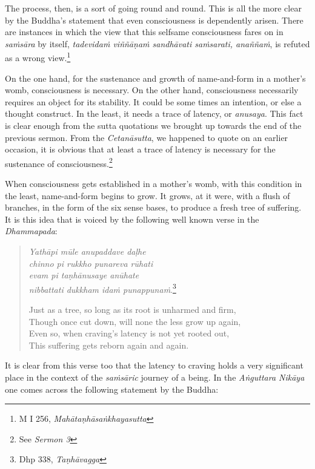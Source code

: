 The process, then, is a sort of going round and round. This is all the more clear by the Buddha's statement that even consciousness is dependently arisen. There are instances in which the view that this selfsame consciousness fares on in \emph{saṁsāra} by itself, \emph{tadevidaṁ viññāṇaṁ sandhāvati saṁsarati, anaññaṁ}, is refuted as a wrong view.\footnote{M I 256, \emph{Mahātaṇhāsaṅkhayasutta}}

On the one hand, for the sustenance and growth of name-and-form in a mother's womb, consciousness is necessary. On the other hand, consciousness necessarily requires an object for its stability. It could be some times an intention, or else a thought construct. In the least, it needs a trace of latency, or \emph{anusaya}. This fact is clear enough from the sutta quotations we brought up towards the end of the previous sermon. From the \emph{Cetanāsutta}, we happened to quote on an earlier occasion, it is obvious that at least a trace of latency is necessary for the sustenance of consciousness.\footnote{See \emph{Sermon 3}}

When consciousness gets established in a mother's womb, with this condition in the least, name-and-form begins to grow. It grows, at it were, with a flush of branches, in the form of the six sense bases, to produce a fresh tree of suffering. It is this idea that is voiced by the following well known verse in the \emph{Dhammapada}:

\begin{quote}
\emph{Yathāpi mūle anupaddave daḷhe}\\
\emph{chinno pi rukkho punareva rūhati}\\
\emph{evam pi taṇhānusaye anūhate}\\
\emph{nibbattati dukkham idaṁ punappunaṁ}.\footnote{Dhp 338, \emph{Taṇhāvagga}}

Just as a tree, so long as its root is unharmed and firm,\\
Though once cut down, will none the less grow up again,\\
Even so, when craving's latency is not yet rooted out,\\
This suffering gets reborn again and again.
\end{quote}

It is clear from this verse too that the latency to craving holds a very significant place in the context of the \emph{saṁsāric} journey of a being. In the \emph{Aṅguttara Nikāya} one comes across the following statement by the Buddha:

